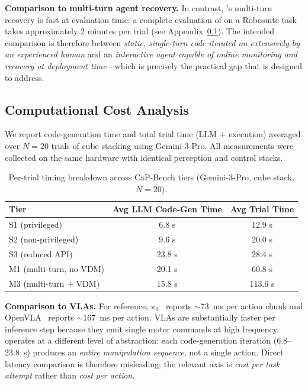 \textbf{Comparison to multi-turn agent recovery.} In contrast, \sysname{}'s multi-turn recovery is fast at evaluation time: a complete evaluation of \sysname{} on a Robosuite task takes approximately 2 minutes per trial (see Appendix~\ref{app:compute_cost}). The intended comparison is therefore between \emph{static, single-turn code iterated on extensively by an experienced human} and an \emph{interactive agent capable of online monitoring and recovery at deployment time}---which is precisely the practical gap that \sysname{} is designed to address.

\subsection{Computational Cost Analysis}
\label{app:compute_cost}
We report code-generation time and total trial time (LLM + execution) averaged over $N{=}20$ trials of cube stacking using Gemini-3-Pro. All measurements were collected on the same hardware with identical perception and control stacks.

\begin{table}[h]
\centering
\small
\begin{tabular}{lcc}
\toprule
Tier & Avg LLM Code-Gen Time & Avg Trial Time \\
\midrule
S1 (privileged) & 6.8 s & 12.9 s \\
S2 (non-privileged) & 9.6 s & 20.0 s \\
S3 (reduced API) & 23.8 s & 28.4 s \\
M1 (multi-turn, no VDM) & 20.1 s & 60.8 s \\
M3 (multi-turn + VDM) & 15.8 s & 113.6 s \\
\bottomrule
\end{tabular}
\caption{Per-trial timing breakdown across CaP-Bench tiers (Gemini-3-Pro, cube stack, $N{=}20$).}
\label{tab:compute_cost}
\end{table}

\textbf{Comparison to VLAs.} For reference, $\pi_0$~\cite{black2024pi0visionlanguageactionflowmodel} reports $\sim$73~ms per action chunk and OpenVLA~\cite{kim2024openvlaopensourcevisionlanguageactionmodel} reports $\sim$167~ms per action. VLAs are substantially faster per inference step because they emit single motor commands at high frequency. \sysname{} operates at a different level of abstraction: each code-generation iteration (6.8--23.8~s) produces an \emph{entire manipulation sequence}, not a single action. Direct latency comparison is therefore misleading; the relevant axis is \emph{cost per task attempt} rather than \emph{cost per action}.

